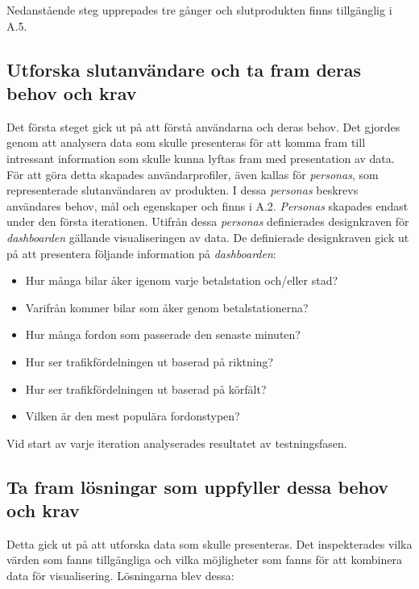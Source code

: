 \documentclass[12pt]{kththesis}
\begin{document}
Nedanstående steg upprepades tre gånger och slutprodukten finns tillgänglig i A.5.  

\subsection{ Utforska slutanvändare och ta fram deras behov och krav
}
Det första steget gick ut på att förstå användarna och deras behov. Det gjordes genom att analysera data som skulle presenteras för att komma fram till intressant information som skulle kunna lyftas fram med presentation av data. För att göra detta skapades användarprofiler, även kallas för \textit{personas}, som representerade slutanvändaren av produkten. I dessa \textit{personas} beskrevs användares behov, mål och egenskaper och finns i A.2. \textit{Personas} skapades endast under den första iterationen. Utifrån dessa \textit{personas} definierades designkraven för \textit{dashboarden} gällande visualiseringen av data. De definierade designkraven gick ut på att presentera följande information på \textit{dashboarden}:

\begin{itemize}
\item Hur många bilar åker igenom varje betalstation och/eller stad?
\item Varifrån kommer bilar som åker genom betalstationerna? 
\item Hur många fordon som passerade den senaste minuten? 
\item Hur ser trafikfördelningen ut baserad på riktning? 
\item Hur ser trafikfördelningen ut baserad på körfält? 
\item Vilken är den mest populära fordonstypen?
\end{itemize}

Vid start av varje iteration analyserades resultatet av testningsfasen. 

\subsection{Ta fram lösningar som uppfyller dessa behov och krav }
Detta gick ut på att utforska data som skulle presenteras. Det inspekterades vilka värden som fanns tillgängliga och vilka möjligheter som fanns för att kombinera data för visualisering. Lösningarna blev dessa:
 
\end{document}
